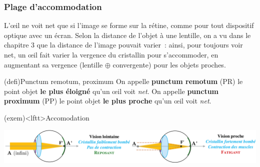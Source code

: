 \documentclass[../../main/main.tex]{subfiles}
\begin{document}
\subsubsection{Plage d'accommodation}
L'œil ne voit net que si l'image se forme sur la rétine, comme pour tout
dispositif optique avec un écran. Selon la distance de l'objet à une lentille,
on a vu dans le chapitre 3 que la distance de l'image pouvait varier~: ainsi,
pour toujours voir net, un œil fait varier la vergence du cristallin pour
s'accommoder, en augmentant sa vergence (lentille $\oplus$ convergente) pour les objets proches.
\begin{tcb*}[label=def:pppr, sidebyside](defi){Punctum remotum, proximum}
	On appelle \textbf{punctum remotum} (PR) le point objet \textbf{le plus
		éloigné} qu'un œil voit \textit{net}.
	\tcblower
	On appelle \textbf{punctum proximum} (PP) le point objet \textbf{le plus
		proche} qu'un œil voit \textit{net}.
\end{tcb*}
\begin{tcb}[width=\linewidth](exem)<lftt>{Accomodation}
	\begin{center}
		\includegraphics[width=\linewidth]{oeil_acco-sidebyside}
		\label{fig:oeil_acco}
	\end{center}
\end{tcb}
\end{document}
